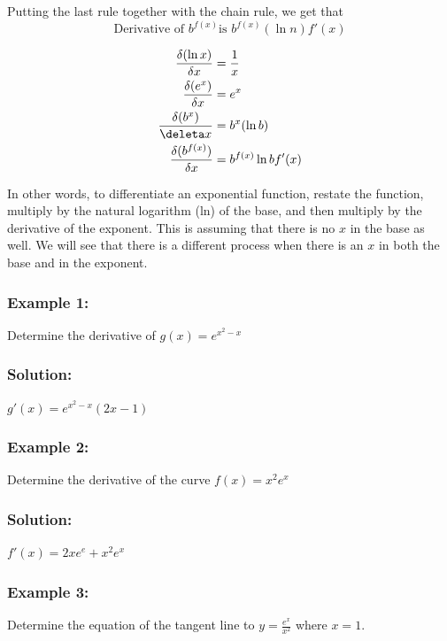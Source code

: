 \documentclass{article}
\begin{document}
Putting the last rule together with the chain rule, we get that
$$\text{Derivative of } b^{f(x)} \text{is } b^{f(x)}(\ln n)f'(x)$$
\begin{tcolorbox}[colback=blue!5!snow, colframe=white!50!white,
  colbacktitle=blue!75!mistyrose, title=Derivatives of Exponential Functions Rules]
    \begin{align*}
        \frac{\delta(\ln x)}{\delta x}&=\frac{1}{x}\\
        \frac{\delta(e^x)}{\delta x}&=e^x\\
        \frac{\delta (b^x)}{\deleta x}&= b^{x}(\ln b)\\
        \frac{\delta (b^{f(x)})}{\delta x}&=b^{f(x)}\ln b f'(x)\\
    \end{align*}  
\end{tcolorbox}
In other words, to differentiate an exponential function, restate the function, multiply by the natural logarithm (ln) of the base, and then multiply by the derivative of the exponent. This is assuming that there is no $x$ in the base as well. We will see that there is a different process when there is an $x$ in both the base and in the exponent.

\subsubsection*{Example 1:}
Determine the derivative of $g(x)=e^{x^2-x}$
\subsubsection*{Solution: }
$g'(x)=e^{x^2-x}(2x-1)$
\subsubsection*{Example 2:}
Determine the derivative of the curve $f(x)=x^2e^x$
\subsubsection*{Solution:}
$f'(x)=2xe^e+x^2e^x$
\subsubsection*{Example 3:}
Determine the equation of the tangent line to $y=\frac{e^x}{x^2}$ where $x=1$.
\end{document}

